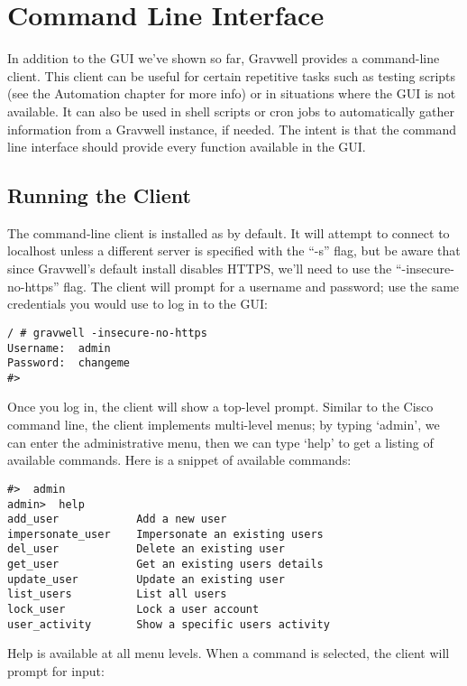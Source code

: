 \chapter{Command Line Interface}

In addition to the GUI we've shown so far, Gravwell provides a
command-line client. This client can be useful for certain repetitive
tasks such as testing scripts (see the Automation chapter for more info)
or in situations where the GUI is not available. It can also be used in
shell scripts or cron jobs to automatically gather information from a
Gravwell instance, if needed. The intent is that the command line
interface should provide every function available in the GUI.

\section{Running the Client}

The command-line client is installed as  by
default. It will attempt to connect to localhost unless a different
server is specified with the ``-s'' flag, but be aware that since Gravwell's
default install disables HTTPS, we'll need to use the ``-insecure-no-https''
flag. The client will prompt for a username and password; use the same
credentials you would use to log in to the GUI:

\begin{Verbatim}[breaklines=true]
/ # gravwell -insecure-no-https
Username:  admin
Password:  changeme
#>
\end{Verbatim}

Once you log in, the client will show a top-level prompt. Similar to
the Cisco command line, the client implements multi-level menus; by
typing `admin', we can enter the administrative menu, then we can type
`help' to get a listing of available commands. Here is a snippet of
available commands:

\begin{Verbatim}[breaklines=true]
#>  admin
admin>  help
add_user            Add a new user
impersonate_user    Impersonate an existing users
del_user            Delete an existing user
get_user            Get an existing users details
update_user         Update an existing user
list_users          List all users
lock_user           Lock a user account
user_activity       Show a specific users activity
\end{Verbatim}

Help is available at all menu levels. When a command is selected,
the client will prompt for input:

